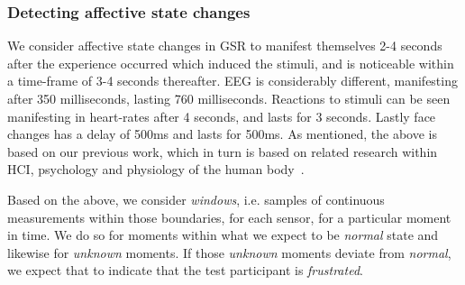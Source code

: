 \subsubsection{Detecting affective state changes}
We consider affective state changes in GSR to manifest themselves 2-4 seconds after the experience occurred which
induced the stimuli, and is noticeable within a time-frame of 3-4 seconds thereafter. EEG is considerably different,
manifesting after 350 milliseconds, lasting 760 milliseconds. Reactions to stimuli can be seen manifesting in heart-rates
after 4 seconds, and lasts for 3 seconds. Lastly face changes has a delay of 500ms and lasts for 500ms. As mentioned,
the above is based on our previous work, which in turn is based on related research within HCI, psychology and
physiology of the human body~\cite{9th_semester_project}.

Based on the above, we consider \textit{windows}, i.e. samples of continuous measurements within those boundaries, for
each sensor, for a particular moment in time. We do so for moments within what we expect to be \textit{normal} state and
likewise for \textit{unknown} moments. If those \textit{unknown} moments deviate from \textit{normal}, we expect that to
indicate that the test participant is \textit{frustrated}.

%
%
%
%

